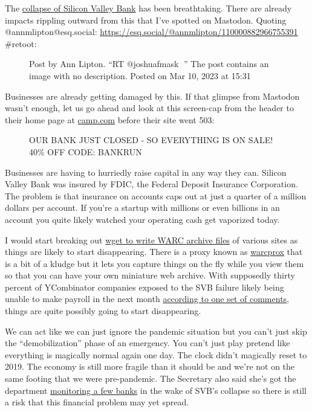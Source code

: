 The
\href{https://arstechnica.com/tech-policy/2023/03/silicon-valley-bank-shut-down-by-us-banking-regulators/}{collapse
of Silicon Valley Bank} has been breathtaking. There are already impacts
rippling outward from this that I've spotted on Mastodon. Quoting
@annmlipton@esq.social:
\url{https://esq.social/@annmlipton/110000882966755391} \#retoot:

\begin{figure}
\centering
{}
\caption{Post by Ann Lipton. ``RT @joshuafmask 🤔'' The post contains an
image with no description. Posted on Mar 10, 2023 at 15:31}
\end{figure}

Businesses are already getting damaged by this. If that glimpse from
Mastodon wasn't enough, let us go ahead and look at this screen-cap from
the header to their home page at
\href{https://web.archive.org/web/20230310220216/https://camp.com/}{camp.com}
before their site went 503:

\begin{figure}
\centering
{}
\caption{OUR BANK JUST CLOSED - SO EVERYTHING IS ON SALE! 40\% OFF CODE:
BANKRUN}
\end{figure}

Businesses are having to hurriedly raise capital in any way they can.
Silicon Valley Bank was insured by FDIC, the Federal Deposit Insurance
Corporation. The problem is that insurance on accounts caps out at just
a quarter of a million dollars per account. If you're a startup with
millions or even billions in an account you quite likely watched your
operating cash get vaporized today.

I would start breaking out
\href{https://wiki.archiveteam.org/index.php/Wget_with_WARC_output}{wget
to write WARC archive files} of various sites as things are likely to
start disappearing. There is a proxy known as
\href{https://github.com/internetarchive/warcprox}{warcprox} that is a
bit of a kludge but it lets you capture things on the fly while you view
them so that you can have your own miniature web archive. With
supposedly thirty percent of YCombinator companies exposed to the SVB
failure likely being unable to make payroll in the next month
\href{https://news.ycombinator.com/item?id=35100743}{according to one
set of comments}, things are quite possibly going to start disappearing.

We can act like we can just ignore the pandemic situation but you can't
just skip the ``demobilization'' phase of an emergency. You can't just
play pretend like everything is magically normal again one day. The
clock didn't magically reset to 2019. The economy is still more fragile
than it should be and we're not on the same footing that we were
pre-pandemic. The Secretary also said she's got the department
\href{https://finance.yahoo.com/news/yellen-says-treasury-department-carefully-watching-crisis-at-a-few-banks-153243680.html}{monitoring
a few banks} in the wake of SVB's collapse so there is still a risk that
this financial problem may yet spread.
